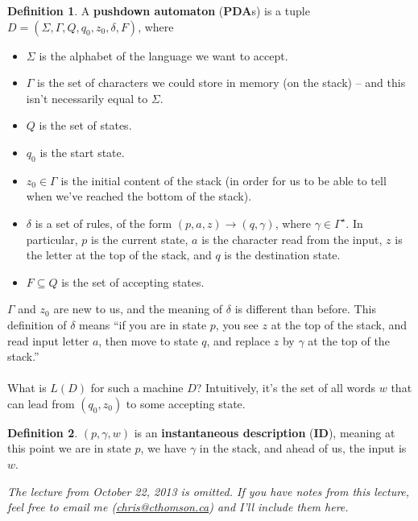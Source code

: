 \documentclass[]{article}
\theoremstyle{definition}
\newtheorem*{defn}{Definition}
\newcommand{\lecture}[1]{\marginpar{{\footnotesize $\leftarrow$ \underline{#1}}}}
\begin{document}
      \begin{defn}
        A \textbf{pushdown automaton} (\textbf{PDA}s) is a tuple $D = (\Sigma, \Gamma, Q, q_0, z_0, \delta, F)$, where
        \begin{itemize}
          \item $\Sigma$ is the alphabet of the language we want to accept.
          \item $\Gamma$ is the set of characters we could store in memory (on the stack) -- and this isn't necessarily equal to $\Sigma$.
          \item $Q$ is the set of states.
          \item $q_0$ is the start state.
          \item $z_0 \in \Gamma$ is the initial content of the stack (in order for us to be able to tell when we've reached the bottom of the stack).
          \item $\delta$ is a set of rules, of the form $(p, a, z) \to (q, \gamma)$, where $\gamma \in \Gamma^\star$. In particular, $p$ is the current state, $a$ is the character read from the input, $z$ is the letter at the top of the stack, and $q$ is the destination state.
          \item $F \subseteq Q$ is the set of accepting states.
        \end{itemize}
      \end{defn}

      $\Gamma$ and $z_0$ are new to us, and the meaning of $\delta$ is different than before. This definition of $\delta$ means ``if you are in state $p$, you see $z$ at the top of the stack, and read input letter $a$, then move to state $q$, and replace $z$ by $\gamma$ at the top of the stack.''
      \\ \\
      What is $L(D)$ for such a machine $D$? Intuitively, it's the set of all words $w$ that can lead from $(q_0, z_0)$ to some accepting state.

      \begin{defn}
        $(p, \gamma, w)$ is an \textbf{instantaneous description} (\textbf{ID}), meaning at this point we are in state $p$, we have $\gamma$ in the stack, and ahead of us, the input is $w$.
      \end{defn}

      \lecture{October 22, 2013}
        \emph{The lecture from October 22, 2013 is omitted. If you have notes from this lecture, feel free to email me (\href{mailto:chris@cthomson.ca}{chris@cthomson.ca}) and I'll include them here.}
\end{document}
